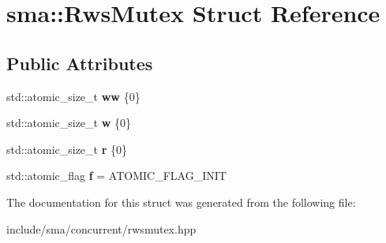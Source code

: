 \hypertarget{structsma_1_1RwsMutex}{\section{sma\-:\-:Rws\-Mutex Struct Reference}
\label{structsma_1_1RwsMutex}
}
\subsection*{Public Attributes}
\begin{DoxyCompactItemize}
\item 
\hypertarget{structsma_1_1RwsMutex_ad1ca207e8aa1d93b755a0e2625b2d121}{std\-::atomic\-\_\-size\-\_\-t {\bfseries ww} \{0\}}\label{structsma_1_1RwsMutex_ad1ca207e8aa1d93b755a0e2625b2d121}

\item 
\hypertarget{structsma_1_1RwsMutex_a21a663fbf2ca0b45cdbdb43cf7b769e0}{std\-::atomic\-\_\-size\-\_\-t {\bfseries w} \{0\}}\label{structsma_1_1RwsMutex_a21a663fbf2ca0b45cdbdb43cf7b769e0}

\item 
\hypertarget{structsma_1_1RwsMutex_a2343926bbdb014e8bac3fcab340fc19a}{std\-::atomic\-\_\-size\-\_\-t {\bfseries r} \{0\}}\label{structsma_1_1RwsMutex_a2343926bbdb014e8bac3fcab340fc19a}

\item 
\hypertarget{structsma_1_1RwsMutex_a871f813f6126665acde29597bde9ca7a}{std\-::atomic\-\_\-flag {\bfseries f} = A\-T\-O\-M\-I\-C\-\_\-\-F\-L\-A\-G\-\_\-\-I\-N\-I\-T}\label{structsma_1_1RwsMutex_a871f813f6126665acde29597bde9ca7a}

\end{DoxyCompactItemize}


The documentation for this struct was generated from the following file\-:\begin{DoxyCompactItemize}
\item 
include/sma/concurrent/rwsmutex.\-hpp\end{DoxyCompactItemize}

